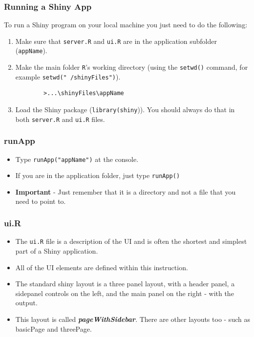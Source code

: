 \documentclass{beamer}
\begin{document}
\begin{frame}[fragile]
	\frametitle{Running a Shiny App}
	\Large
	To run a Shiny program on your local machine you just need to do the following:
	\begin{enumerate}
		\item  Make sure that \texttt{server.R} and \texttt{ui.R} are in the application subfolder (\texttt{appName}).
		\item Make the main folder \texttt{R}'s working directory (using the \texttt{setwd()} command, for
		example \texttt{setwd("~/shinyFiles")}).
		\begin{verbatim}
		>...\shinyFiles\appName
		\end{verbatim}
		\item Load the Shiny package (\texttt{library(shiny})). You
		should always do that in both \texttt{server.R} and \texttt{ui.R} files.
	\end{enumerate}
	
	
\end{frame}
\begin{frame}
	\frametitle{runApp}
	\Large
	\vspace{-1.5cm}
	\begin{itemize}
		\item Type \texttt{runApp("appName")} at the console.
		\item If you are in the application folder, just type \texttt{runApp()}
		\item \textbf{Important} - Just remember that it is a directory
		and not a file that you need to point to.
	\end{itemize}
\end{frame}
\begin{frame}
	\frametitle{ui.R}
	\Large
	\begin{itemize}
		\item The \texttt{ui.R} file is a description of the UI and is often the shortest and simplest part of
		a Shiny application. \item All of the UI elements are defined
		within this instruction.
		\item The standard shiny layout is a three panel layout, with a header panel, a sidepanel 
		controls on the left, and the main panel on the right - with the output.
		\item This layout is called \textbf{\emph{pageWithSidebar}}. There are other layouts too - such as basicPage and threePage.
	\end{itemize}
	
\end{frame}
\end{document}
